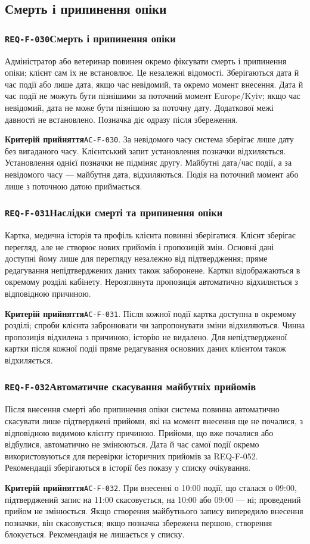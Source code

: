 \documentclass[11pt,a4paper]{article}
\newcommand{\requirement}[4]{%
  \Needspace{7\baselineskip}%
  \subsubsection*{\hypertarget{#1}{\texttt{#1}}\quad #2}%
  #3\par
  \textbf{Критерій прийняття}\quad #4\par\medskip}
\begin{document}
\subsection{Смерть і припинення опіки}
\requirement{REQ-F-030}{Смерть і припинення опіки}{Адміністратор або ветеринар повинен окремо фіксувати смерть і припинення опіки; клієнт сам їх не встановлює. Це незалежні відомості. Зберігаються дата й час події або лише дата, якщо час невідомий, та окремо момент внесення. Дата й час події не можуть бути пізнішими за поточний момент Europe/Kyiv; якщо час невідомий, дата не може бути пізнішою за поточну дату. Додаткової межі давності не встановлено. Позначка діє одразу після збереження.}{\hypertarget{AC-F-030}{\texttt{AC-F-030}}. За невідомого часу система зберігає лише дату без вигаданого часу. Клієнтський запит установлення позначки відхиляється. Установлення однієї позначки не підміняє другу. Майбутні дата/час події, а за невідомого часу — майбутня дата, відхиляються. Подія на поточний момент або лише з поточною датою приймається.}

\requirement{REQ-F-031}{Наслідки смерті та припинення опіки}{Картка, медична історія та профіль клієнта повинні зберігатися. Клієнт зберігає перегляд, але не створює нових прийомів і пропозицій змін. Основні дані доступні йому лише для перегляду незалежно від підтвердження; пряме редагування непідтверджених даних також заборонене. Картки відображаються в окремому розділі кабінету. Нерозглянута пропозиція автоматично відхиляється з відповідною причиною.}{\hypertarget{AC-F-031}{\texttt{AC-F-031}}. Після кожної події картка доступна в окремому розділі; спроби клієнта забронювати чи запропонувати зміни відхиляються. Чинна пропозиція відхилена з причиною; історію не видалено. Для непідтвердженої картки після кожної події пряме редагування основних даних клієнтом також відхиляється.}

\requirement{REQ-F-032}{Автоматичне скасування майбутніх прийомів}{Після внесення смерті або припинення опіки система повинна автоматично скасувати лише підтверджені прийоми, які на момент внесення ще не почалися, з відповідною видимою клієнту причиною. Прийоми, що вже почалися або відбулися, автоматично не змінюються. Дата й час самої події окремо використовуються для перевірки історичних прийомів за REQ-F-052. Рекомендації зберігаються в історії без показу у списку очікування.}{\hypertarget{AC-F-032}{\texttt{AC-F-032}}. При внесенні о 10:00 події, що сталася о 09:00, підтверджений запис на 11:00 скасовується, на 10:00 або 09:00 — ні; проведений прийом не змінюється. Якщо створення майбутнього запису випередило внесення позначки, він скасовується; якщо позначка збережена першою, створення блокується. Рекомендація не лишається у списку.}
\end{document}
